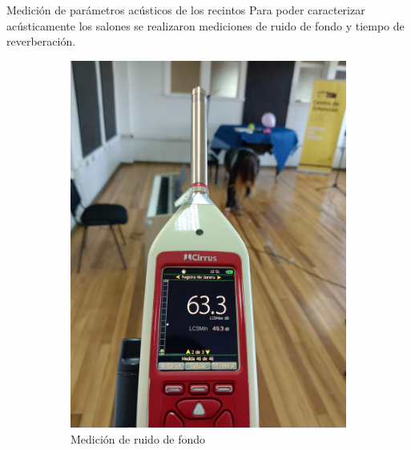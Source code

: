 \documentclass{sintefbeamer}
\begin{document}
\begin{frame}{Medición de parámetros acústicos de los recintos}
    Para poder caracterizar acústicamente los salones se realizaron mediciones de ruido de fondo y tiempo de reverberación.

    \begin{figure}[h!]
        \centering
        \begin{subfigure}[b]{0.15\linewidth}
            \includegraphics[width=\linewidth]{images/Fotos Mediciones/medicionRDF.jpeg}
            \caption{Medición de ruido de fondo}
            \label{fig: medicion de rdf}
        \end{subfigure}
        \begin{subfigure}[b]{0.15\linewidth}

\end{subfigure}
\end{figure}
\end{frame}
\end{document}
